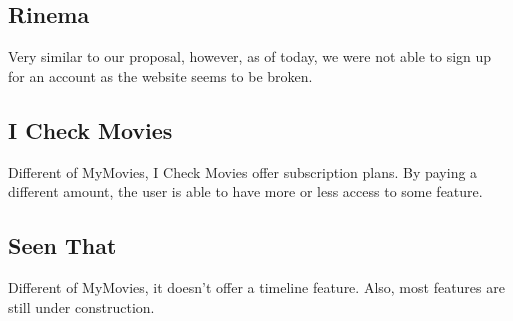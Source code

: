\subsection{Rinema\cite{rinema}}

Very similar to our proposal, however, as of today, we were not able to sign up
for an account as the website seems to be broken.

\subsection{I Check Movies\cite{icheckmovies}}

Different of MyMovies, I Check Movies offer subscription plans. By paying a
different amount, the user is able to have more or less access to some feature.

\subsection{Seen That\cite{seenthat}}

Different of MyMovies, it doesn't offer a timeline feature. Also, most features
are still under construction.




%
%
%
%
%


